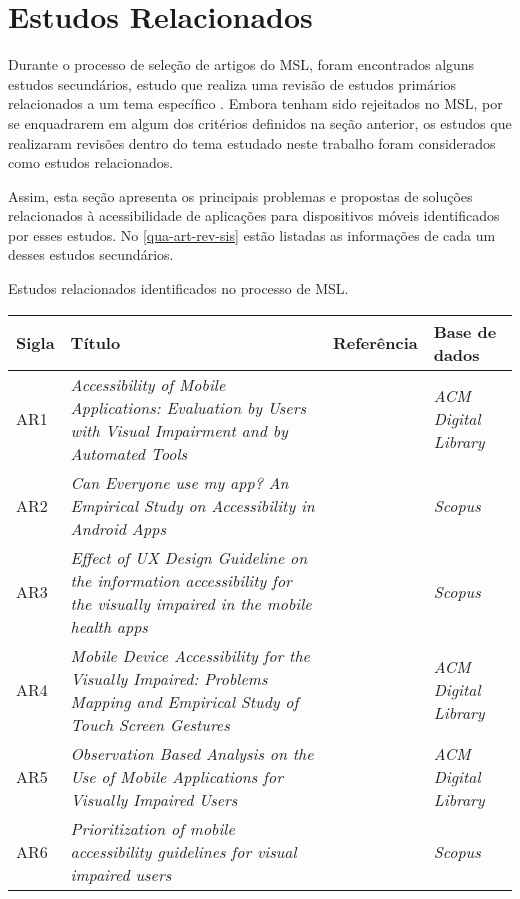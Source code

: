 \section{Estudos Relacionados}

Durante o processo de seleção de artigos do MSL, foram encontrados alguns estudos secundários, estudo que realiza uma revisão de estudos primários relacionados a um tema específico \cite{Kitchenham2007}.
Embora tenham sido rejeitados no MSL, por se enquadrarem em algum dos critérios definidos na seção anterior, os estudos que realizaram revisões dentro do tema estudado neste trabalho foram considerados como estudos relacionados.

Assim, esta seção apresenta os principais problemas e propostas de soluções relacionados à acessibilidade de aplicações para dispositivos móveis identificados por esses estudos.
No \autoref{qua-art-rev-sis} estão listadas as informações de cada um desses estudos secundários.

\begin{quadro}[htb!]
  \caption{\label{qua-art-rev-sis}Estudos relacionados identificados no processo de MSL.}
  \begin{tabular}{|m{0.8cm} | m{8.2cm} | m{2.7cm} | m{2.5cm}|}
    \hline
    \textbf{Sigla} & \textbf{Título}                                                                                                             & \textbf{Referência}  & \textbf{Base de dados}     \\
    \hline
    AR1            & \emph{Accessibility of Mobile Applications: Evaluation by Users with Visual Impairment and by Automated Tools}              & \cite{Mateus2020}    & \emph{ACM Digital Library} \\
    \hline
    AR2            & \emph{Can Everyone use my app? An Empirical Study on Accessibility in Android Apps}                                         & \cite{Vendome201941} & \emph{Scopus}              \\
    \hline
    AR3            & \emph{Effect of UX Design Guideline on the information accessibility for the visually impaired in the mobile health apps}   & \cite{Kim20191103}   & \emph{Scopus}              \\
    \hline
    AR4            & \emph{Mobile Device Accessibility for the Visually Impaired: Problems Mapping and Empirical Study of Touch Screen Gestures} & \cite{Damaceno2016}  & \emph{ACM Digital Library} \\
    \hline
    AR5            & \emph{Observation Based Analysis on the Use of Mobile Applications for Visually Impaired Users}                             & \cite{Siebra2016}    & \emph{ACM Digital Library} \\
    \hline
    AR6            & \emph{Prioritization of mobile accessibility guidelines for visual impaired users}                                          & \cite{Quispe2020}    & \emph{Scopus}              \\
    \hline
  \end{tabular}
\end{quadro}

